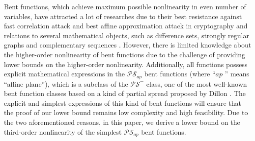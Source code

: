 \documentclass{article}
\newcommand{\0}{\textbf{0}}
\newcommand{\1}{\textbf{1}}
\theoremstyle{plain}
\begin{document}
    Bent functions, which achieve maximum possible nonlinearity in even number of variables,
    have attracted a lot of researches due to their best resistance against fast correlation attack \cite{MS1988fast_correlation_attack} and best affine approximation attack \cite{DingXS1991book} in cryptography and relations to several mathematical objects, such as difference sets, strongly regular graphs and complementary sequences \cite{Carlet2020book}.
    However, there is limited knowledge about the higher-order nonlinearity of bent functions due to the challenge of providing lower bounds on the higher-order nonlinearity.
    Additionally, all functions possess explicit mathematical expressions in the $\mathcal{PS}_{ap}$ bent functions (where ``$ap$ '' means ``affine plane''), which is a subclass of the $\mathcal{PS}^-$ class, one of the most well-known bent function classes based on a kind of partial spread proposed by Dillon \cite{Dillon1974PSbent}.
    The explicit and simplest expressions of this kind of bent functions will ensure that the proof of our lower bound remains low complexity and high feasibility.
    Due to the two aforementioned reasons,
    in this paper, we derive a lower bound on the third-order nonlinearity of the simplest $\mathcal{PS}_{ap}$ bent functions.
\end{document}

